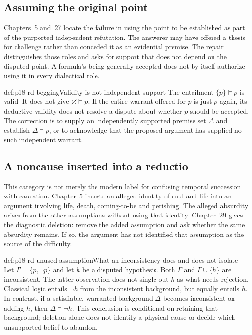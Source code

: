 \subsection{Assuming the original point}

Chapters~5 and~27 locate the failure in using the point to be established
as part of the purported independent refutation. The answerer may have
offered a thesis for challenge rather than conceded it as an evidential
premise. The repair distinguishes those roles and asks for support that
does not depend on the disputed point. A formula's being generally
accepted does not by itself authorize using it in every dialectical role.

\begin{hbexample}{def:p18-rd-begging}{Validity is not independent support}
The entailment \(\{p\}\models p\) is valid. It does not give
\(\varnothing\models p\). If the entire warrant offered for
\(p\) is just \(p\) again, its deductive validity does not
resolve a dispute about whether \(p\) should be accepted.
The correction is to supply an independently supported premise set
\(\Delta\) and establish \(\Delta\models p\), or to acknowledge
that the proposed argument has supplied no such independent warrant.
\end{hbexample}

\subsection{A noncause inserted into a reductio}

This category is not merely the modern label for confusing temporal
succession with causation. Chapter~5 inserts an alleged identity of
soul and life into an argument involving life, death, coming-to-be
and perishing. The alleged absurdity arises from the other assumptions
without using that identity. Chapter~29 gives the diagnostic deletion:
remove the added assumption and ask whether the same absurdity remains.
If so, the argument has not identified that assumption as the source
of the difficulty.

\begin{hbexample}{def:p18-rd-unused-assumption}{What an inconsistency does and does not isolate}
Let \(\Gamma=\{p,\neg p\}\) and let \(h\) be a disputed
hypothesis. Both \(\Gamma\) and \(\Gamma\cup\{h\}\) are
inconsistent. The latter observation does not single out \(h\) as
what needs rejection. Classical logic entails \(\neg h\) from
the inconsistent background, but equally entails \(h\).
In contrast, if a satisfiable, warranted background \(\Delta\)
becomes inconsistent on adding \(h\), then
\(\Delta\models\neg h\). This conclusion is conditional on
retaining that background; deletion alone does not identify a physical
cause or decide which unsupported belief to abandon.
\end{hbexample}

